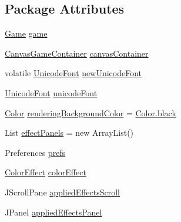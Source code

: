 \subsection*{Package Attributes}
\begin{DoxyCompactItemize}
\item 
\mbox{\hyperlink{interfaceorg_1_1newdawn_1_1slick_1_1_game}{Game}} \mbox{\hyperlink{classorg_1_1newdawn_1_1slick_1_1tools_1_1hiero_1_1_hiero_a447034c1ec539650e7cd60cdfdeead33}{game}}
\item 
\mbox{\hyperlink{classorg_1_1newdawn_1_1slick_1_1_canvas_game_container}{Canvas\+Game\+Container}} \mbox{\hyperlink{classorg_1_1newdawn_1_1slick_1_1tools_1_1hiero_1_1_hiero_a4c424782a802cfd90d1304f55c405c58}{canvas\+Container}}
\item 
volatile \mbox{\hyperlink{classorg_1_1newdawn_1_1slick_1_1_unicode_font}{Unicode\+Font}} \mbox{\hyperlink{classorg_1_1newdawn_1_1slick_1_1tools_1_1hiero_1_1_hiero_a460520e36f2d16d14c0478c45960a632}{new\+Unicode\+Font}}
\item 
\mbox{\hyperlink{classorg_1_1newdawn_1_1slick_1_1_unicode_font}{Unicode\+Font}} \mbox{\hyperlink{classorg_1_1newdawn_1_1slick_1_1tools_1_1hiero_1_1_hiero_a655ba3408dfa898a78d246f3da30f19c}{unicode\+Font}}
\item 
\mbox{\hyperlink{classorg_1_1newdawn_1_1slick_1_1_color}{Color}} \mbox{\hyperlink{classorg_1_1newdawn_1_1slick_1_1tools_1_1hiero_1_1_hiero_a5160d483a3f8ea0a78cfbed01abe5855}{rendering\+Background\+Color}} = \mbox{\hyperlink{classorg_1_1newdawn_1_1slick_1_1_color_ac9ec721980ab1c388e82e2f8e584f002}{Color.\+black}}
\item 
List \mbox{\hyperlink{classorg_1_1newdawn_1_1slick_1_1tools_1_1hiero_1_1_hiero_a84dc85d78d9ad7b44e24e045b0a0cd84}{effect\+Panels}} = new Array\+List()
\item 
Preferences \mbox{\hyperlink{classorg_1_1newdawn_1_1slick_1_1tools_1_1hiero_1_1_hiero_aa7062bea3ffd4639b589cd06000dbfc6}{prefs}}
\item 
\mbox{\hyperlink{classorg_1_1newdawn_1_1slick_1_1font_1_1effects_1_1_color_effect}{Color\+Effect}} \mbox{\hyperlink{classorg_1_1newdawn_1_1slick_1_1tools_1_1hiero_1_1_hiero_ac8bd87c081b8bcc14e2646e883a89e44}{color\+Effect}}
\item 
J\+Scroll\+Pane \mbox{\hyperlink{classorg_1_1newdawn_1_1slick_1_1tools_1_1hiero_1_1_hiero_a0ee49b3aeb7a3ff8350e273ec5f54df9}{applied\+Effects\+Scroll}}
\item 
J\+Panel \mbox{\hyperlink{classorg_1_1newdawn_1_1slick_1_1tools_1_1hiero_1_1_hiero_af3ffcf548dfbc171feacb865c1302904}{applied\+Effects\+Panel}}

\end{DoxyCompactItemize}
